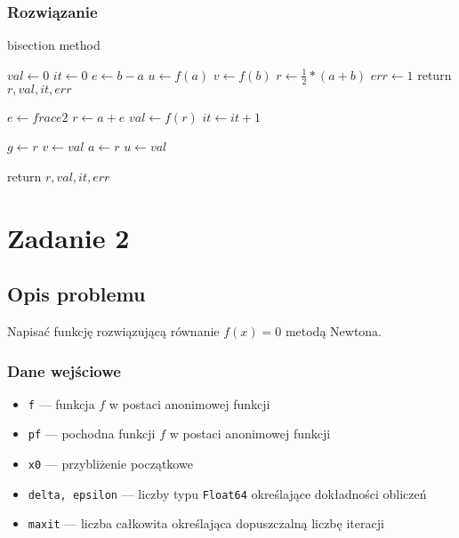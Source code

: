 \documentclass{article}
\begin{document}
\subsubsection*{Rozwiązanie}
	\begin{algorithm}[H]
	\caption{bisection method}
	\begin{algorithmic}
		\State $val \gets 0$
        \State $it \gets 0$
        \State $e \gets b - a$
        \State $u \gets f(a)$
        \State $v \gets f(b)$
        \State $r \gets \frac{1}{2} * (a + b)$
        	\State $err \gets 1$
        	\State return $r, val, it, err$
        \EndIf

        	\State $e \gets frac{e}{2}$
        	\State $r \gets a + e$
        	\State $val \gets f(r)$
        	\State $it \gets it + 1$

        		\State $g \gets r$
        		\State $v \gets val$
        	\Else
        		\State $a \gets r$
        		\State $u \gets val$
        	\EndIf
        \EndWhile

        \State return $r, val, it, err$
    \end{algorithmic}
    \end{algorithm}

\clearpage

\section*{Zadanie 2}
\subsection*{Opis problemu}
	Napisać funkcję rozwiązującą równanie $f(x) = 0$ metodą Newtona.
\subsubsection*{Dane wejściowe}
	\begin{itemize}
	    \item \texttt{f} — funkcja $f$ w postaci anonimowej funkcji
	    \item \texttt{pf} — pochodna funkcji $f$ w postaci anonimowej funkcji
	    \item \texttt{x0} — przybliżenie początkowe
	    \item \texttt{delta, epsilon} — liczby typu \texttt{Float64} określające dokładności obliczeń
	    \item \texttt{maxit} — liczba całkowita określająca dopuszczalną liczbę iteracji
	\end{itemize}
\end{document}
